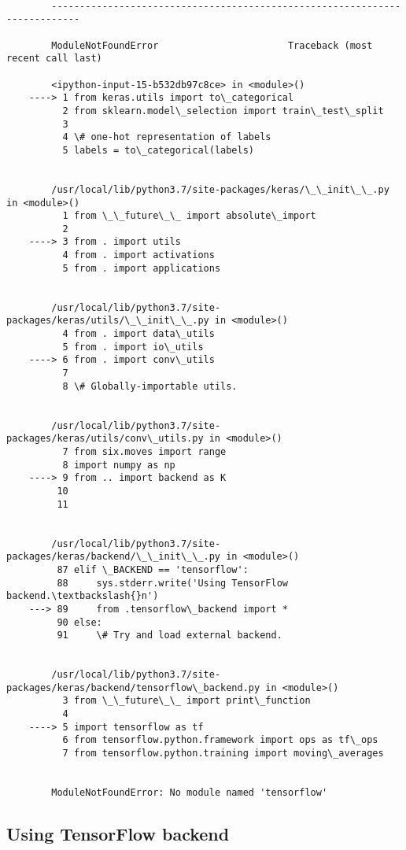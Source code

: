 \documentclass[11pt]{article}
\begin{document}
    \begin{Verbatim}[commandchars=\\\{\}]

        ---------------------------------------------------------------------------

        ModuleNotFoundError                       Traceback (most recent call last)

        <ipython-input-15-b532db97c8ce> in <module>()
    ----> 1 from keras.utils import to\_categorical
          2 from sklearn.model\_selection import train\_test\_split
          3 
          4 \# one-hot representation of labels
          5 labels = to\_categorical(labels)


        /usr/local/lib/python3.7/site-packages/keras/\_\_init\_\_.py in <module>()
          1 from \_\_future\_\_ import absolute\_import
          2 
    ----> 3 from . import utils
          4 from . import activations
          5 from . import applications


        /usr/local/lib/python3.7/site-packages/keras/utils/\_\_init\_\_.py in <module>()
          4 from . import data\_utils
          5 from . import io\_utils
    ----> 6 from . import conv\_utils
          7 
          8 \# Globally-importable utils.


        /usr/local/lib/python3.7/site-packages/keras/utils/conv\_utils.py in <module>()
          7 from six.moves import range
          8 import numpy as np
    ----> 9 from .. import backend as K
         10 
         11 


        /usr/local/lib/python3.7/site-packages/keras/backend/\_\_init\_\_.py in <module>()
         87 elif \_BACKEND == 'tensorflow':
         88     sys.stderr.write('Using TensorFlow backend.\textbackslash{}n')
    ---> 89     from .tensorflow\_backend import *
         90 else:
         91     \# Try and load external backend.


        /usr/local/lib/python3.7/site-packages/keras/backend/tensorflow\_backend.py in <module>()
          3 from \_\_future\_\_ import print\_function
          4 
    ----> 5 import tensorflow as tf
          6 from tensorflow.python.framework import ops as tf\_ops
          7 from tensorflow.python.training import moving\_averages


        ModuleNotFoundError: No module named 'tensorflow'

    \end{Verbatim}

    \hypertarget{using-tensorflow-backend}{%
\subsection{Using TensorFlow backend}\label{using-tensorflow-backend}}
\end{document}
